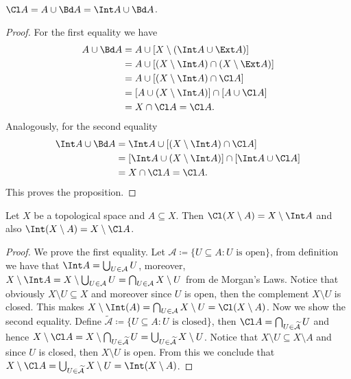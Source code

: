 \begin{proposition}
\label{prop:closure-composition}
\(\Cl A = A \cup \Bd A = \Int A \cup \Bd A\).
\end{proposition}

\begin{proof}
For the first equality we have
\begin{align*}
  A \cup \Bd A
  &= A \cup [X \setminus (\Int A \cup \Ext A)] \\
  &= A \cup [(X \setminus \Int A) \cap (X \setminus \Ext A)] \\
  &= A \cup [(X \setminus \Int A) \cap \Cl A] \\
  &= [A \cup (X \setminus \Int A)] \cap [A \cup \Cl A] \\
  &= X \cap \Cl A = \Cl A.
\end{align*}
Analogously, for the second equality
\begin{align*}
  \Int A \cup \Bd A
  &= \Int A \cup [(X \setminus \Int A) \cap \Cl A] \\
  &= [\Int A \cup (X \setminus \Int A)] \cap [\Int A \cup \Cl A] \\
  &= X \cap \Cl A = \Cl A.
\end{align*}
This proves the proposition.
\end{proof}

\begin{proposition}
Let \(X\) be a topological space and \(A \subseteq X\). Then
\(\Cl(X \setminus A) = X \setminus \Int A\) and also
\(\Int(X \setminus A) = X \setminus \Cl A\).
\end{proposition}

\begin{proof}
We prove the first equality. Let
\(\mathcal A \coloneq \{U \subseteq A \colon U \text{ is open}\}\), from
definition we have that \(\Int A = \bigcup_{U \in \mathcal A} U\), moreover,
\(X \setminus \Int A = X \setminus \bigcup_{U \in \mathcal A} U = \bigcap_{U \in
  \mathcal A} X \setminus U\) from de Morgan's Laws. Notice that obviously
\(X \setminus U \subseteq X\) and moreover since \(U\) is open, then the
complement \(X \setminus U\) is closed. This makes
\(X \setminus \Int(A) = \bigcap_{U \in \mathcal A} X \setminus U = \Cl(X
\setminus A)\). Now we show the second equality. Define
\(\mathcal{\widetilde A} \coloneq \{U \subseteq A \colon U \text{ is
  closed}\}\), then \(\Cl A = \bigcap_{U \in \mathcal{\widetilde A}} U\) and
hence
\(X \setminus \Cl A = X \setminus \bigcap_{U \in \mathcal{\widetilde A}} U =
\bigcup_{U \in \widetilde{\mathcal{A}}} X \setminus U\). Notice that
\(X\setminus U \subseteq X \setminus A\) and since \(U\) is closed, then
\(X \setminus U\) is open. From this we conclude that
\(X \setminus \Cl A = \bigcup_{U \in \mathcal{\widetilde A}} X \setminus U =
\Int(X \setminus A)\).
\end{proof}


